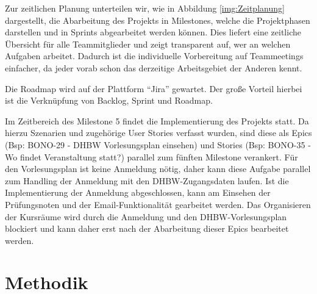 \documentclass[a4paper,11pt]{scrartcl}
\begin{document}
Zur zeitlichen Planung unterteilen wir, wie in Abbildung \ref{img:Zeitplanung} dargestellt, die Abarbeitung des Projekts in Milestones, welche die Projektphasen darstellen und in Sprints abgearbeitet werden können. Dies liefert eine zeitliche Übersicht für alle Teammitglieder und zeigt transparent auf, wer an welchen Aufgaben arbeitet. Dadurch ist die individuelle Vorbereitung auf Teammeetings einfacher, da jeder vorab schon das derzeitige Arbeitsgebiet der Anderen kennt.

Die Roadmap wird auf der Plattform "`Jira"' gewartet. Der große Vorteil hierbei ist die Verknüpfung von Backlog, Sprint und Roadmap.

Im Zeitbereich des Milestone 5 findet die Implementierung des Projekts statt. Da hierzu Szenarien und zugehörige User Stories verfasst wurden, sind diese als Epics (Bsp: BONO-29 - DHBW Vorlesungsplan einsehen) und Stories (Bsp: BONO-35 - Wo findet Veranstaltung statt?) parallel zum fünften Milestone verankert. 
Für den Vorlesungsplan ist keine Anmeldung nötig, daher kann diese Aufgabe parallel zum Handling der Anmeldung mit den DHBW-Zugangsdaten laufen. Ist die Implementierung der Anmeldung abgeschlossen, kann am Einsehen der Prüfungsnoten und der Email-Funktionalität gearbeitet werden.
Das Organisieren der Kursräume wird durch die Anmeldung und den DHBW-Vorlesungsplan blockiert und kann daher erst nach der Abarbeitung dieser Epics bearbeitet werden.
 



\section{Methodik}\label{sec:methodik}
\end{document}
